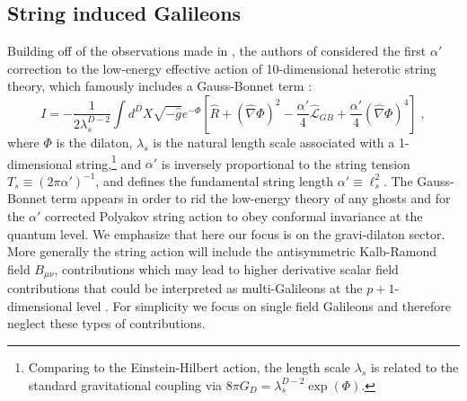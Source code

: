 \documentclass[amsmath,amssymb,11pt]{article}
\newcommand{\beq}{\begin{equation}}
\newcommand{\eeq}{\end{equation}}
\begin{document}

\subsection{String induced Galileons}

Building off of the observations made in \cite{VanAcoleyen11-1}, the authors of \cite{Easson:2020bgk} considered the first $\alpha'$ correction to the low-energy effective action of 10-dimensional heterotic string theory, which famously includes a Gauss-Bonnet term \cite{Zwiebach85-1,Sen:1985qt,Gross86-1,Gross:1986mw,Metsaev:1987zx}:
\beq I=-\frac{1}{2\lambda^{D-2}_{s}}\int d^{D}X\sqrt{-\hat{g}}e^{-\Phi}\left[\hat{R}+(\hat{\nabla}\Phi)^{2}-\frac{\alpha'}{4}\hat{\mathcal{L}}_{GB}+\frac{\alpha'}{4}(\hat{\nabla}\Phi)^{4}\right]\;,\label{stringact1}\eeq
where $\Phi$ is the dilaton, $\lambda_{s}$ is the natural length scale associated with a 1-dimensional string,\footnote{Comparing to the Einstein-Hilbert action, the length scale $\lambda_{s}$ is related to the standard gravitational coupling via $8\pi G_{D}=\lambda^{D-2}_{s}\exp(\Phi)$.} and $\alpha'$ is inversely proportional to the string tension $T_{s}\equiv (2\pi\alpha')^{-1}$, and defines the fundamental string length $\alpha'\equiv\ell_{s}^{2}$. The Gauss-Bonnet term appears in order to rid the low-energy theory of any ghosts and for the $\alpha'$ corrected Polyakov string action to obey conformal invariance at the quantum level. We emphasize that here our focus is on the gravi-dilaton sector. More generally the string action will include the antisymmetric Kalb-Ramond field $B_{\mu\nu}$, contributions which may lead to higher derivative scalar field contributions that could be interpreted as multi-Galileons at the $p+1$-dimensional level \cite{Bakhmatov:2019dow}. For simplicity we focus on single field Galileons and therefore neglect these types of contributions. 
\end{document}
